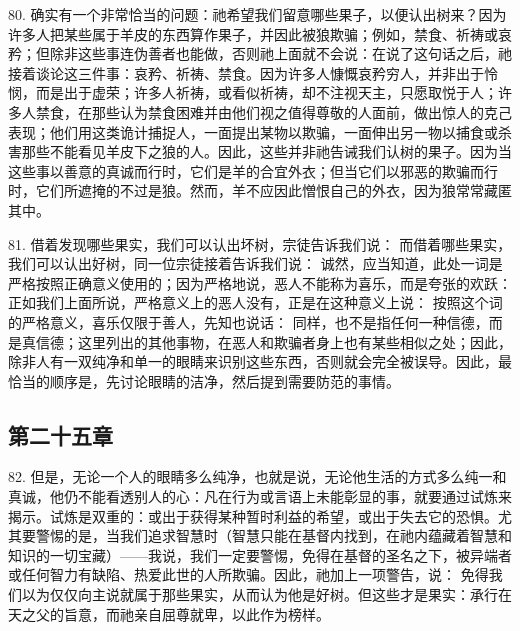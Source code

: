 80. 确实有一个非常恰当的问题：祂希望我们留意哪些果子，以便认出树来？因为许多人把某些属于羊皮的东西算作果子，并因此被狼欺骗；例如，禁食、祈祷或哀矜；但除非这些事连伪善者也能做，否则祂上面就不会说：在说了这句话之后，祂接着谈论这三件事：哀矜、祈祷、禁食。因为许多人慷慨哀矜穷人，并非出于怜悯，而是出于虚荣；许多人祈祷，或看似祈祷，却不注视天主，只愿取悦于人；许多人禁食，在那些认为禁食困难并由他们视之值得尊敬的人面前，做出惊人的克己表现；他们用这类诡计捕捉人，一面提出某物以欺骗，一面伸出另一物以捕食或杀害那些不能看见羊皮下之狼的人。因此，这些并非祂告诫我们认树的果子。因为当这些事以善意的真诚而行时，它们是羊的合宜外衣；但当它们以邪恶的欺骗而行时，它们所遮掩的不过是狼。然而，羊不应因此憎恨自己的外衣，因为狼常常藏匿其中。\par

81. 借着发现哪些果实，我们可以认出坏树，宗徒告诉我们说： 而借着哪些果实，我们可以认出好树，同一位宗徒接着告诉我们说： 诚然，应当知道，此处一词是严格按照正确意义使用的；因为严格地说，恶人不能称为喜乐，而是夸张的欢跃：正如我们上面所说，严格意义上的恶人没有，正是在这种意义上说： 按照这个词的严格意义，喜乐仅限于善人，先知也说话： 同样，也不是指任何一种信德，而是真信德；这里列出的其他事物，在恶人和欺骗者身上也有某些相似之处；因此，除非人有一双纯净和单一的眼睛来识别这些东西，否则就会完全被误导。因此，最恰当的顺序是，先讨论眼睛的洁净，然后提到需要防范的事情。\par


\subsection{第二十五章}

82. 但是，无论一个人的眼睛多么纯净，也就是说，无论他生活的方式多么纯一和真诚，他仍不能看透别人的心：凡在行为或言语上未能彰显的事，就要通过试炼来揭示。试炼是双重的：或出于获得某种暂时利益的希望，或出于失去它的恐惧。尤其要警惕的是，当我们追求智慧时（智慧只能在基督内找到，在祂内蕴藏着智慧和知识的一切宝藏）——我说，我们一定要警惕，免得在基督的圣名之下，被异端者或任何智力有缺陷、热爱此世的人所欺骗。因此，祂加上一项警告，说： 免得我们以为仅仅向主说就属于那些果实，从而认为他是好树。但这些才是果实：承行在天之父的旨意，而祂亲自屈尊就卑，以此作为榜样。\par

